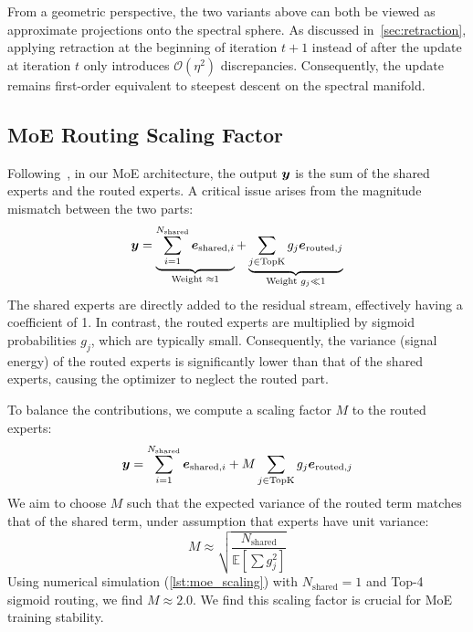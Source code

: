 From a geometric perspective, the two variants above can both be viewed as approximate projections onto the spectral sphere. As discussed in~\cref{sec:retraction}, applying retraction at the beginning of iteration $t+1$ instead of after the update at iteration $t$ only introduces $\mathcal{O}(\eta^2)$ discrepancies. Consequently, the update remains first-order equivalent to steepest descent on the spectral manifold.

\subsection{MoE Routing Scaling Factor}
\label{app:moe_scaling}

Following~\citep{kexuefm-10945}, in our MoE architecture, the output ${\bm{y}}$ is the sum of the shared experts and the routed experts. A critical issue arises from the magnitude mismatch between the two parts:
\begin{equation}
{\bm{y}} = \underbrace{\sum_{i=1}^{N_{\text{shared}}} {\bm{e}}_{\text{shared}, i}}_{\text{Weight } \approx 1} + \underbrace{\sum_{j \in \text{TopK}} g_j {\bm{e}}_{\text{routed}, j}}_{\text{Weight } g_j \ll 1}
\end{equation}
The shared experts are directly added to the residual stream, effectively having a coefficient of 1. In contrast, the routed experts are multiplied by sigmoid probabilities $g_j$, which are typically small. Consequently, the variance (signal energy) of the routed experts is significantly lower than that of the shared experts, causing the optimizer to neglect the routed part.

To balance the contributions, we compute a scaling factor $M$ to the routed experts:
\begin{equation}
{\bm{y}} = \sum_{i=1}^{N_{\text{shared}}} {\bm{e}}_{\text{shared},i} + M \sum_{j\in\text{TopK}} g_j {\bm{e}}_{\text{routed},j}
\end{equation}
We aim to choose $M$ such that the expected variance of the routed term matches that of the shared term, under assumption that experts have unit variance:
\begin{equation}
M \approx \sqrt{\frac{N_{\text{shared}}}{\mathbb{E}[\sum g_j^2]}}
\end{equation}
Using numerical simulation (\cref{lst:moe_scaling}) with $N_{\text{shared}}=1$ and Top-4 sigmoid routing, we find $M \approx 2.0$. We find this scaling factor is crucial for MoE training stability.

